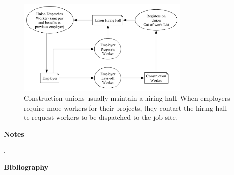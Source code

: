 \begin{figure}
  \centering
  \includegraphics[width=0.75\textwidth]{images/hiring_hall}
  \captionsetup{justification=centering, singlelinecheck=false, margin=2cm} 
  \caption{Construction unions usually maintain a hiring hall. When employers require more workers for their projects, they contact the hiring hall to request workers to be dispatched to the job site.}
  \label{fig:hiring_hall}
\end{figure}


\newpage
\begin{center}
{\bfseries Notes}
\end{center}

\noindent
.
\newpage
\begin{center}
{\bfseries Bibliography}
\end{center}



